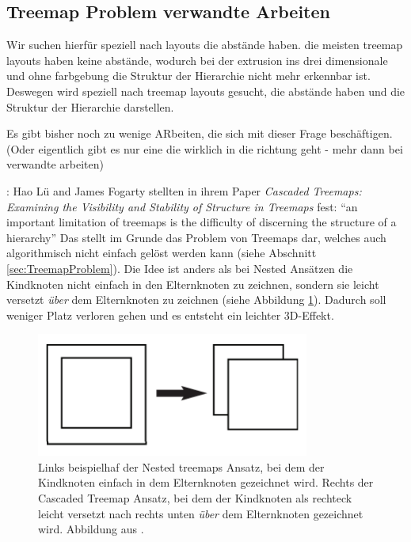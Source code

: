 \subsection{Treemap Problem verwandte Arbeiten}
Wir suchen hierfür speziell nach layouts die abstände haben. die meisten treemap layouts haben keine abstände, wodurch bei der extrusion ins drei dimensionale und ohne farbgebung die Struktur der Hierarchie nicht mehr erkennbar ist. Deswegen wird speziell nach treemap layouts gesucht, die abstände haben und die Struktur der Hierarchie darstellen.


Es gibt bisher noch zu wenige ARbeiten, die sich mit dieser Frage beschäftigen. (Oder eigentlich gibt es nur eine die wirklich in die richtung geht - mehr dann bei verwandte arbeiten)


\cite{lu2008cascaded}:
Hao Lü and James Fogarty stellten in ihrem Paper \textit{Cascaded Treemaps:
Examining the Visibility and Stability of Structure in Treemaps}\cite{lu2008cascaded} fest: \enquote{an important limitation of treemaps is
the difficulty of discerning the structure of a hierarchy}\cite[1]{lu2008cascaded} Das stellt im Grunde das Problem von Treemaps dar, welches auch algorithmisch nicht einfach gelöst werden kann (siehe Abschnitt \ref{sec:TreemapProblem}). Die Idee ist anders als bei Nested Ansätzen die Kindknoten nicht einfach in den Elternknoten zu zeichnen, sondern sie leicht versetzt \textit{über} dem Elternknoten zu zeichnen (siehe Abbildung \ref{fig:cascaded}). Dadurch soll weniger Platz verloren gehen und es entsteht ein leichter 3D-Effekt.

\begin{figure}
    \centering
    \includegraphics[width=0.8\textwidth]{images/cascaded.png}
    \caption{Links beispielhaf der Nested treemaps Ansatz, bei dem der Kindknoten einfach in dem Elternknoten gezeichnet wird. Rechts der Cascaded Treemap Ansatz, bei dem der Kindknoten als rechteck leicht versetzt nach rechts unten \textit{über} dem Elternknoten gezeichnet wird. Abbildung aus \cite[3]{lu2008cascaded}.}
    \label{fig:cascaded}
\end{figure}

